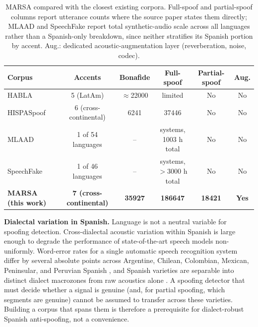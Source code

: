 \documentclass[11pt]{article}
\begin{document}
\begin{table}[t]
\centering
\caption{MARSA compared with the closest existing corpora. Full-spoof
and partial-spoof columns report utterance counts where the source
paper states them directly; MLAAD and SpeechFake report total
synthetic-audio scale across all languages rather than a Spanish-only
breakdown, since neither stratifies its Spanish portion by accent.
Aug.: dedicated acoustic-augmentation layer (reverberation, noise,
codec).}
\label{tab:corpuscompare}
\small
\begin{tabular}{lccccc}
\toprule
\textbf{Corpus} & \textbf{Accents} & \textbf{Bonafide} & \textbf{Full-spoof} & \textbf{Partial-spoof} & \textbf{Aug.} \\
\midrule
HABLA \citep{habla}      & 5 (LatAm)         & $\approx$22000 & limited     & No & No \\
HISPASpoof \citep{hispaspoof} & 6 (cross-continental) & 6241 & 37446 & No & No \\
MLAAD \citep{mlaad}      & 1 of 54 languages & --      & \multicolumn{1}{c}{\parbox{2.1cm}{ systems,\\1003 h total}} & No & No \\
SpeechFake \citep{speechfake} & 1 of 46 languages & -- & \multicolumn{1}{c}{\parbox{2.1cm}{ systems,\\$>$3000 h total}} & No & No \\
\textbf{MARSA (this work)} & \textbf{7 (cross-continental)} & \textbf{35927} & \textbf{186647} & \textbf{18421} & \textbf{Yes} \\
\bottomrule
\end{tabular}
\end{table}

\textbf{Dialectal variation in Spanish.} Language is not a neutral variable for spoofing detection. Cross-dialectal acoustic variation within Spanish is large enough to degrade the performance of state-of-the-art speech models non-uniformly. Word-error rates for a single automatic speech recognition system differ by several absolute points across Argentine, Chilean, Colombian, Mexican, Peninsular, and Peruvian Spanish \citep{kantharuban2023dialectgap,nacimiento2024biases}, and Spanish varieties are separable into distinct dialect macrozones from raw acoustics alone \citep{zuluaga2023commonaccent}. A spoofing detector that must decide whether a signal is genuine (and, for partial spoofing, which segments are genuine) cannot be assumed to transfer across these varieties. Building a corpus that spans them is therefore a prerequisite for dialect-robust Spanish anti-spoofing, not a convenience.
\end{document}
